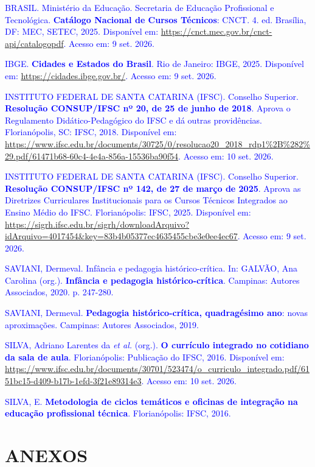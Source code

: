 \documentclass{../../modelos/latex-shared/ifsc-ppc}
\newcommand{\revisao}[1]{\textcolor{blue}{#1}}
\newcommand{\revisao}[1]{#1}
\begin{document}
{\revisao{BRASIL. Ministério da Educação. Secretaria de Educação Profissional e Tecnológica. \textbf{Catálogo Nacional de Cursos Técnicos}: CNCT. 4. ed. Brasília, DF: MEC, SETEC, 2025. Disponível em: \url{https://cnct.mec.gov.br/cnct-api/catalogopdf}. Acesso em: 9 set. 2026.}

\revisao{IBGE. \textbf{Cidades e Estados do Brasil}. Rio de Janeiro: IBGE, 2025. Disponível em: \url{https://cidades.ibge.gov.br/}. Acesso em: 9 set. 2026.}

\revisao{INSTITUTO FEDERAL DE SANTA CATARINA (IFSC). Conselho Superior. \textbf{Resolução CONSUP/IFSC nº 20, de 25 de junho de 2018}. Aprova o Regulamento Didático-Pedagógico do IFSC e dá outras providências. Florianópolis, SC: IFSC, 2018. Disponível em: \url{https://www.ifsc.edu.br/documents/30725/0/resolucao20_2018_rdp1\%2B\%282\%29.pdf/61471b68-60c4-4e4a-856a-15536ba90f54}. Acesso em: 10 set. 2026.}

\revisao{INSTITUTO FEDERAL DE SANTA CATARINA (IFSC). Conselho Superior. \textbf{Resolução CONSUP/IFSC nº 142, de 27 de março de 2025}. Aprova as Diretrizes Curriculares Institucionais para os Cursos Técnicos Integrados ao Ensino Médio do IFSC. Florianópolis: IFSC, 2025. Disponível em: \url{https://sigrh.ifsc.edu.br/sigrh/downloadArquivo?idArquivo=4017454&key=83b4b05377ec4635455cbe3e0ee4ec67}. Acesso em: 9 set. 2026.}

\revisao{SAVIANI, Dermeval. Infância e pedagogia histórico-crítica. In: GALVÃO, Ana Carolina (org.). \textbf{Infância e pedagogia histórico-crítica}. Campinas: Autores Associados, 2020. p. 247-280.}

\revisao{SAVIANI, Dermeval. \textbf{Pedagogia histórico-crítica, quadragésimo ano}: novas aproximações. Campinas: Autores Associados, 2019.}

\revisao{SILVA, Adriano Larentes da \textit{et al.} (org.). \textbf{O currículo integrado no cotidiano da sala de aula}. Florianópolis: Publicação do IFSC, 2016. Disponível em: \url{https://www.ifsc.edu.br/documents/30701/523474/o_curriculo_integrado.pdf/6151bc15-d409-b17b-1efd-3f21e89314e3}. Acesso em: 10 set. 2026.}

\revisao{SILVA, E. \textbf{Metodologia de ciclos temáticos e oficinas de integração na educação profissional técnica}. Florianópolis: IFSC, 2016.}
\par}

\section{ANEXOS}
\end{document}
